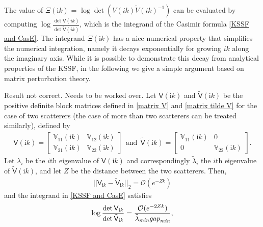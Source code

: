 The value of $\Xi(\mathrm{i}k)$ = $\log\det(V(ik)\tilde{V}(ik)^{-1})$ can be evaluated by computing 
$\log\frac{\det\mathsf{V}(ik)}{\det\tilde{\mathsf{V}}(ik)}$, which is the integrand of the Casimir formula \eqref{KSSF and CasE}. The integrand $\Xi(\mathrm{i}k)$ has a nice numerical property that simplifies the numerical integration, namely it decays exponentially for growing $ik$ along the imaginary axis. While it is possible to demonstrate this decay from analytical properties of the KSSF, in the following we give a simple argument based on matrix perturbation theory.

\begin{theorem}

   {\color{red} Result not correct. Needs to be worked over.}
    Let $\mathsf{V}(\mathrm{i}k)$ and $\tilde{\mathsf{V}}(\mathrm{i}k)$ be the positive definite block matrices defined in \eqref{matrix V} and \eqref{matrix tilde V} 
    for the case of two scatterers (the case of more than two scatterers can be treated similarly), defined by
    \begin{align*}
        \mathsf{V}(\mathrm{i}k) = \begin{bmatrix}
            \mathbb{V}_{11}(\mathrm{i}k) & \mathbb{V}_{12}(\mathrm{i}k)\\
            \mathbb{V}_{21}(\mathrm{i}k) & \mathbb{V}_{22}(\mathrm{i}k)
        \end{bmatrix} \ \ \text{and} \ \   \tilde{\mathsf{V}}(\mathrm{i}k) = \begin{bmatrix}
            \mathbb{V}_{11}(\mathrm{i}k) & 0\\
            0 & \mathbb{V}_{22}(\mathrm{i}k)
        \end{bmatrix}.
    \end{align*} 
    Let $\lambda_i$ be the $i$th eigenvalue of $\mathsf{V}(\mathrm{i}k)$ and correspondingly $\tilde{\lambda}_i$ the $i$th eigenvalue of 
    $ \tilde{\mathsf{V}}(\mathrm{i}k) $, and let $Z$ be the distance between the two scatterers.
    Then, \begin{align*}
        ||\mathsf{V}_{\mathrm{i}k} - \tilde{\mathsf{V}}_{\mathrm{i}k}||_{2} = \mathcal{O}(e^{-Zk})
    \end{align*}
    and the integrand in \eqref{KSSF and CasE} satisfies
    \begin{align}\label{logdet trend}
        \log\frac{\det\mathsf{V}_{\mathrm{i}k}}{\det\tilde{\mathsf{V}}_{\mathrm{i}k}} = \frac{\mathcal{O}(e^{-2Zk})}{\tilde{\lambda}_{\emph{min}}\emph{gap}_{\emph{min}}},
    \end{align}

\end{theorem}
